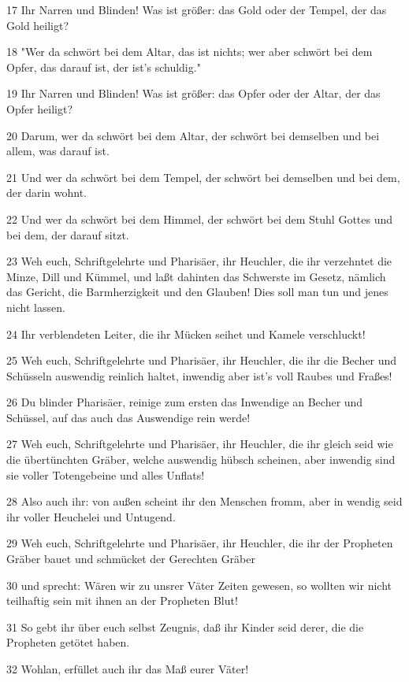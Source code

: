 \par 17 Ihr Narren und Blinden! Was ist größer: das Gold oder der Tempel, der das Gold heiligt?
\par 18 "Wer da schwört bei dem Altar, das ist nichts; wer aber schwört bei dem Opfer, das darauf ist, der ist's schuldig."
\par 19 Ihr Narren und Blinden! Was ist größer: das Opfer oder der Altar, der das Opfer heiligt?
\par 20 Darum, wer da schwört bei dem Altar, der schwört bei demselben und bei allem, was darauf ist.
\par 21 Und wer da schwört bei dem Tempel, der schwört bei demselben und bei dem, der darin wohnt.
\par 22 Und wer da schwört bei dem Himmel, der schwört bei dem Stuhl Gottes und bei dem, der darauf sitzt.
\par 23 Weh euch, Schriftgelehrte und Pharisäer, ihr Heuchler, die ihr verzehntet die Minze, Dill und Kümmel, und laßt dahinten das Schwerste im Gesetz, nämlich das Gericht, die Barmherzigkeit und den Glauben! Dies soll man tun und jenes nicht lassen.
\par 24 Ihr verblendeten Leiter, die ihr Mücken seihet und Kamele verschluckt!
\par 25 Weh euch, Schriftgelehrte und Pharisäer, ihr Heuchler, die ihr die Becher und Schüsseln auswendig reinlich haltet, inwendig aber ist's voll Raubes und Fraßes!
\par 26 Du blinder Pharisäer, reinige zum ersten das Inwendige an Becher und Schüssel, auf das auch das Auswendige rein werde!
\par 27 Weh euch, Schriftgelehrte und Pharisäer, ihr Heuchler, die ihr gleich seid wie die übertünchten Gräber, welche auswendig hübsch scheinen, aber inwendig sind sie voller Totengebeine und alles Unflats!
\par 28 Also auch ihr: von außen scheint ihr den Menschen fromm, aber in wendig seid ihr voller Heuchelei und Untugend.
\par 29 Weh euch, Schriftgelehrte und Pharisäer, ihr Heuchler, die ihr der Propheten Gräber bauet und schmücket der Gerechten Gräber
\par 30 und sprecht: Wären wir zu unsrer Väter Zeiten gewesen, so wollten wir nicht teilhaftig sein mit ihnen an der Propheten Blut!
\par 31 So gebt ihr über euch selbst Zeugnis, daß ihr Kinder seid derer, die die Propheten getötet haben.
\par 32 Wohlan, erfüllet auch ihr das Maß eurer Väter!
